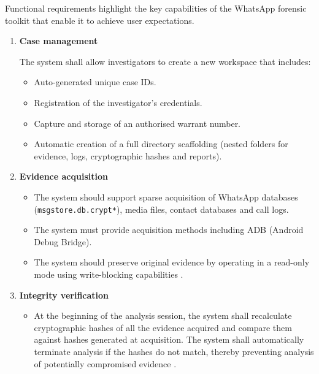 \documentclass[12pt,a4paper]{report}
\begin{document}
Functional requirements highlight the key capabilities of the WhatsApp forensic toolkit that enable it to achieve user expectations.

\begin{enumerate}
    \item \textbf{Case management}

    The system shall allow investigators to create a new workspace that includes:
    \begin{itemize}
        \item Auto-generated unique case IDs.
        \item Registration of the investigator's credentials.
        \item Capture and storage of an authorised warrant number.
        \item Automatic creation of a full directory scaffolding (nested folders for evidence, logs, cryptographic hashes and reports).
    \end{itemize}

    \item \textbf{Evidence acquisition}
    \begin{itemize}
        \item The system should support sparse acquisition of WhatsApp databases (\texttt{msgstore.db.crypt*}), media files, contact databases and call logs.
        \item The system must provide acquisition methods including ADB (Android Debug Bridge).
        \item The system should preserve original evidence by operating in a read-only mode using write-blocking capabilities \citep{kent2006, aggarwal2019}.
    \end{itemize}

    \item \textbf{Integrity verification}
    \begin{itemize}
        \item At the beginning of the analysis session, the system shall recalculate cryptographic hashes of all the evidence acquired and compare them against hashes generated at acquisition. The system shall automatically terminate analysis if the hashes do not match, thereby preventing analysis of potentially compromised evidence \citep{guttman2022}.
    \end{itemize}


\end{enumerate}
\end{document}
